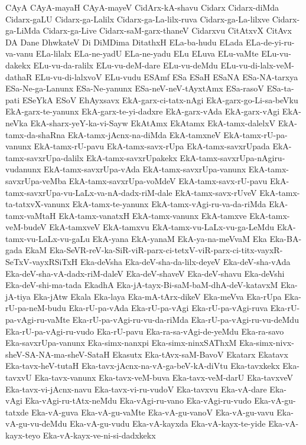 {CAyA
CAyA-mayaH
CAyA-mayeV
CidArx-kA-shavu
Cidarx
Cidarx-diMda
Cidarx-gaLU
Cidarx-ga-Lalilx
Cidarx-ga-La-lilx-ruva
Cidarx-ga-La-lilxve
Cidarx-ga-LiMda
Cidarx-ga-Live
Cidarx-saM-garx-thaneV
Cidarxvu
CitAtxvX
CitAvx
DA
Dane
DhwkateV
Di
DiMDima
DitathxH
ELa-ba-hudu
ELada
ELa-de-yi-ru-va-vanu
ELa-lilalx
ELa-ne-yadU
ELa-ne-yadu
ELu
ELuva
ELu-vaMte
ELu-vu-dakekx
ELu-vu-da-ralilx
ELu-vu-deM-dare
ELu-vu-deMdu
ELu-vu-di-lalx-veM-dathaR
ELu-vu-di-lalxvoV
ELu-vudu
ESAmf
ESa
ESaH
ESaNA
ESa-NA-tarxya
ESa-Ne-ga-Lanunx
ESa-Ne-yanunx
ESa-neV-neV-tAyxtAmx
ESa-rasoV
ESa-ta-pati
ESeYkA
ESoV
EhAyxsavx
EkA-garx-ci-tatx-nAgi
EkA-garx-go-Li-sa-beVku
EkA-garx-te-yanunx
EkA-garx-te-yi-dadxre
EkA-garx-vAda
EkA-garx-vAgi
EkA-neVka
EkA-sharx-yeY-ka-vi-Sayw
EkAtAmx
EkAtamx
EkA-tamx-dalelxV
EkA-tamx-da-shaRna
EkA-tamx-jAcnx-na-diMda
EkA-tamxneV
EkA-tamx-rU-pa-vanunx
EkA-tamx-rU-pavu
EkA-tamx-savx-rUpa
EkA-tamx-savxrUpada
EkA-tamx-savxrUpa-dalilx
EkA-tamx-savxrUpakekx
EkA-tamx-savxrUpa-nAgiru-vudanunx
EkA-tamx-savxrUpa-vAda
EkA-tamx-savxrUpa-vanunx
EkA-tamx-savxrUpa-veMba
EkA-tamx-savxrUpa-voMdeV
EkA-tamx-savx-rU-pavu
EkA-tamx-savxrUpa-vu-LaLx-va-nA-dadx-riM-dale
EkA-tamx-savx-rUveV
EkA-tamx-ta-tatxvX-vanunx
EkA-tamx-te-yanunx
EkA-tamx-vAgi-ru-va-da-riMda
EkA-tamx-vaMtaH
EkA-tamx-vanatxH
EkA-tamx-vanunx
EkA-tamxve
EkA-tamx-veM-budeV
EkA-tamxveV
EkA-tamxvu
EkA-tamx-vu-LaLx-vu-ga-LeMdu
EkA-tamx-vu-LaLx-vu-gaLu
EkA-yana
EkA-yanaM
EkA-ya-na-meVvaM
Eka
Eka-BA-gada
EkaM
Eka-SeVR-reV-ka-SiR-viR-parx-ci-tetxV-viR-parx-ci-titx-vayxR-SeTxV-vayxRSiTxH
Eka-deVsha
Eka-deV-sha-da-lilx-deyeV
Eka-deV-sha-vAda
Eka-deV-sha-vA-dadx-riM-daleV
Eka-deV-shaveV
Eka-deV-shavu
Eka-deVshi
Eka-deV-shi-ma-tada
EkadhA
Eka-jA-tayx-Bi-saM-baM-dhA-deV-katavxM
Eka-jA-tiya
Eka-jAtw
Ekala
Eka-laya
Eka-mA-tArx-dikeV
Eka-meVva
Eka-rUpa
Eka-rU-pa-neM-budu
Eka-rU-pa-vAda
Eka-rU-pa-vAgi
Eka-rU-pa-vAgi-ruva
Eka-rU-pa-vAgi-ru-vaMte
Eka-rU-pa-vAgi-ru-vu-da-riMda
Eka-rU-pa-vAgi-ru-vu-deMdu
Eka-rU-pa-vAgi-ru-vudo
Eka-rU-pavu
Eka-ra-sa-vAgi-de-yeMdu
Eka-ra-savo
Eka-savxrUpa-vanunx
Eka-simx-nanxpi
Eka-simx-ninxSAThxM
Eka-simx-nivx-sheV-SA-NA-ma-sheV-SataH
Ekasutx
Eka-tAvx-saM-BavoV
Ekatarx
Ekatavx
Eka-tavx-heV-tutaH
Eka-tavx-jAcnx-na-vA-ga-beV-kA-diVtu
Eka-tavxkekx
Eka-tavxvU
Eka-tavx-vanunx
Eka-tavx-veM-buva
Eka-tavx-veM-darU
Eka-tavxveV
Eka-tavx-vi-jAcnx-navu
Eka-tavx-vi-ru-vudoV
Eka-tavxvu
Eka-vA-dare
Eka-vAgi
Eka-vAgi-ru-tAtx-neMdu
Eka-vAgi-ru-vano
Eka-vAgi-ru-vudo
Eka-vA-gu-tatxde
Eka-vA-guva
Eka-vA-gu-vaMte
Eka-vA-gu-vanoV
Eka-vA-gu-vavu
Eka-vA-gu-vu-deMdu
Eka-vA-gu-vudu
Eka-vA-kayxda
Eka-vA-kayx-te-yide
Eka-vA-kayx-teyo
Eka-vA-kayx-ve-ni-si-dadxkekx
}
